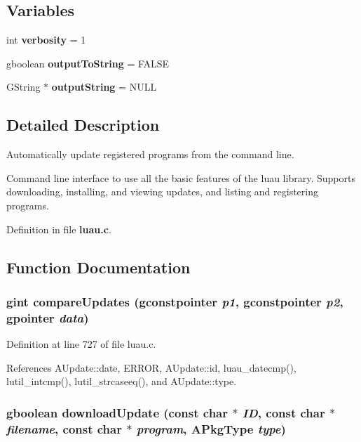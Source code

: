 \subsection*{Variables}
\begin{CompactItemize}
\item 
int {\bf verbosity} = 1
\item 
gboolean {\bf output\-To\-String} = FALSE
\item 
GString $\ast$ {\bf output\-String} = NULL
\end{CompactItemize}


\subsection{Detailed Description}
Automatically update registered programs from the command line. 

Command line interface to use all the basic features of the luau library. Supports downloading, installing, and viewing updates, and listing and registering programs.

Definition in file {\bf luau.c}.

\subsection{Function Documentation}
\subsubsection{\setlength{\rightskip}{0pt plus 5cm}gint compare\-Updates (gconstpointer {\em p1}, gconstpointer {\em p2}, gpointer {\em data})\hspace{0.3cm}{\tt  [static]}}\label{luau_8c_a12}




Definition at line 727 of file luau.c.

References AUpdate::date, ERROR, AUpdate::id, luau\_\-datecmp(), lutil\_\-intcmp(), lutil\_\-strcaseeq(), and AUpdate::type.
\subsubsection{\setlength{\rightskip}{0pt plus 5cm}gboolean download\-Update (const char $\ast$ {\em ID}, const char $\ast$ {\em filename}, const char $\ast$ {\em program}, {\bf APkg\-Type} {\em type})\hspace{0.3cm}{\tt  [static]}}\label{luau_8c_a6}




